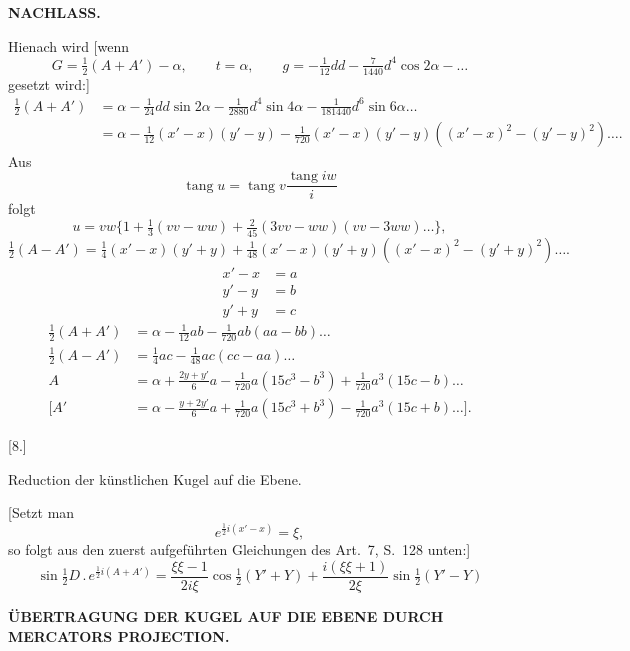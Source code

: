 \par\clearpage
\noindent{}\hfill{\small\textbf{NACHLASS.}}\hfill\null\par\medskip

Hienach wird [wenn
\[
G=\tfrac12(A+A')-\alpha,\qquad t=\alpha,\qquad
g=-\tfrac1{12}dd-\tfrac7{1440}d^4\cos2\alpha-\ldots
\]
\noindent gesetzt wird:]
\[
\begin{aligned}
\tfrac12(A+A')&=\alpha-\tfrac1{24}dd\sin2\alpha-\tfrac1{2880}d^4\sin4\alpha
 -\tfrac1{181440}d^6\sin6\alpha\ldots\\
 &=\alpha-\tfrac1{12}(x'-x)(y'-y)
 -\tfrac1{720}(x'-x)(y'-y)((x'-x)^2-(y'-y)^2)\ldots.
\end{aligned}
\]
Aus
\[
\operatorname{tang}u=\operatorname{tang}v\frac{\operatorname{tang}iw}{i}
\]
\noindent folgt
\[
u=vw\{1+\tfrac13(vv-ww)+\tfrac2{45}(3vv-ww)(vv-3ww)\ldots\},
\]
\noindent [mithin wird für \(u=\tfrac12(A-A')\), \(v=\tfrac12(x'-x)\),
\(w=\tfrac12(y'+y)\):]
\[
\tfrac12(A-A')=\tfrac14(x'-x)(y'+y)
 +\tfrac1{48}(x'-x)(y'+y)((x'-x)^2-(y'+y)^2)\ldots.
\]
\noindent [Wird]
\[
\begin{aligned}
x'-x&=a\\
y'-y&=b\\
y'+y&=c
\end{aligned}
\]
\[
\begin{aligned}
\tfrac12(A+A')&=\alpha-\tfrac1{12}ab-\tfrac1{720}ab(aa-bb)\ldots\\
\tfrac12(A-A')&=\tfrac14ac-\tfrac1{48}ac(cc-aa)\ldots\\
A&=\alpha+\frac{2y+y'}6a-\tfrac1{720}a(15c^3-b^3)+\tfrac1{720}a^3(15c-b)\ldots\\
\mathopen{[}A'&=\alpha-\frac{y+2y'}6a+\tfrac1{720}a(15c^3+b^3)
 -\tfrac1{720}a^3(15c+b)\ldots\mathclose{]}.
\end{aligned}
\]

\begin{center}
[8.]\par\medskip
Reduction der künstlichen Kugel auf die Ebene.
\end{center}
[Setzt man
\[
e^{\frac12i(x'-x)}=\xi,
\]
\noindent so folgt aus den zuerst aufgeführten Gleichungen des Art.\ 7, S.\ 128 unten:]
\[
\sin\tfrac12D\,.\,e^{\frac12i(A+A')}
 =\frac{\xi\xi-1}{2i\xi}\cos\tfrac12(Y'+Y)
 +\frac{i(\xi\xi+1)}{2\xi}\sin\tfrac12(Y'-Y)
\]

\par\clearpage
\noindent\null\hfill{\fontsize{8}{10}\selectfont\textbf{ÜBERTRAGUNG DER KUGEL AUF DIE EBENE DURCH MERCATORS PROJECTION.}}\hfill{}\par\medskip

